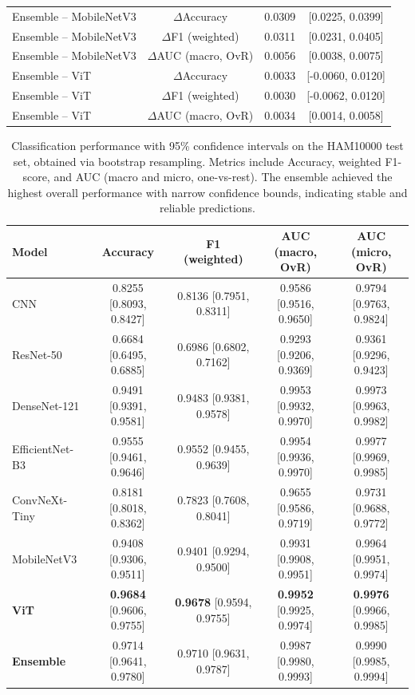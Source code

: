 \documentclass[pdflatex,sn-mathphys-num]{sn-jnl}%
\theoremstyle{thmstyleone}%
\theoremstyle{thmstyletwo}%
\theoremstyle{thmstylethree}%
\begin{document}
\begin{table}[!htbp]
\begin{tabular*}{\textwidth}{@{\extracolsep\fill}lccc}
Ensemble – MobileNetV3     & $\Delta$Accuracy         & 0.0309 & [0.0225, 0.0399] \\
Ensemble – MobileNetV3     & $\Delta$F1 (weighted)    & 0.0311 & [0.0231, 0.0405] \\
Ensemble – MobileNetV3     & $\Delta$AUC (macro, OvR) & 0.0056 & [0.0038, 0.0075] \\
Ensemble – ViT             & $\Delta$Accuracy         & 0.0033 & [-0.0060, 0.0120] \\
Ensemble – ViT             & $\Delta$F1 (weighted)    & 0.0030 & [-0.0062, 0.0120] \\
Ensemble – ViT             & $\Delta$AUC (macro, OvR) & 0.0034 & [0.0014, 0.0058] \\
\bottomrule
\end{tabular*}
\end{table}

\begin{table}[!htbp]
\centering
\caption{Classification performance with 95\% confidence intervals on the HAM10000 test set, obtained via bootstrap resampling. 
Metrics include Accuracy, weighted F1-score, and AUC (macro and micro, one-vs-rest). 
The ensemble achieved the highest overall performance with narrow confidence bounds, indicating stable and reliable predictions.}
\label{tab:ham10000_ci}
\footnotesize
\setlength{\tabcolsep}{4pt}
\renewcommand{\arraystretch}{1.1}
\begin{tabular*}{\textwidth}{@{\extracolsep\fill}lcccc}
\toprule
\textbf{Model} & \textbf{Accuracy} & \textbf{F1 (weighted)} & \textbf{AUC (macro, OvR)} & \textbf{AUC (micro, OvR)} \\
\midrule
CNN & 0.8255 [0.8093, 0.8427] & 0.8136 [0.7951, 0.8311] & 0.9586 [0.9516, 0.9650] & 0.9794 [0.9763, 0.9824] \\
ResNet-50 & 0.6684 [0.6495, 0.6885] & 0.6986 [0.6802, 0.7162] & 0.9293 [0.9206, 0.9369] & 0.9361 [0.9296, 0.9423] \\
DenseNet-121 & 0.9491 [0.9391, 0.9581] & 0.9483 [0.9381, 0.9578] & 0.9953 [0.9932, 0.9970] & 0.9973 [0.9963, 0.9982] \\
EfficientNet-B3 & 0.9555 [0.9461, 0.9646] & 0.9552 [0.9455, 0.9639] & 0.9954 [0.9936, 0.9970] & 0.9977 [0.9969, 0.9985] \\
ConvNeXt-Tiny & 0.8181 [0.8018, 0.8362] & 0.7823 [0.7608, 0.8041] & 0.9655 [0.9586, 0.9719] & 0.9731 [0.9688, 0.9772] \\
MobileNetV3 & 0.9408 [0.9306, 0.9511] & 0.9401 [0.9294, 0.9500] & 0.9931 [0.9908, 0.9951] & 0.9964 [0.9951, 0.9974] \\
\textbf{ViT} & \textbf{0.9684} [0.9606, 0.9755] & \textbf{0.9678} [0.9594, 0.9755] & \textbf{0.9952} [0.9925, 0.9974] & \textbf{0.9976} [0.9966, 0.9985] \\
\textbf{Ensemble} & 0.9714 [0.9641, 0.9780] & 0.9710 [0.9631, 0.9787] & 0.9987 [0.9980, 0.9993] & 0.9990 [0.9985, 0.9994] \\
\bottomrule
\end{tabular*}
\end{table}
\end{document}
